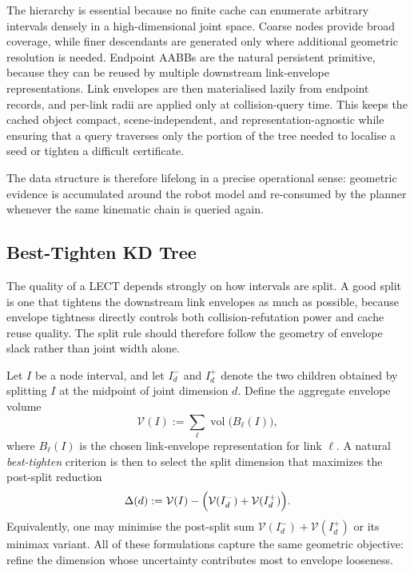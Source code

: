 \documentclass[journal]{IEEEtran}
\begin{document}
The hierarchy is essential because no finite cache can enumerate arbitrary
intervals densely in a high-dimensional joint space. Coarse nodes provide broad
coverage, while finer descendants are generated only where additional geometric
resolution is needed. Endpoint AABBs are the natural persistent primitive,
because they can be reused by multiple downstream link-envelope
representations. Link envelopes are then materialised lazily from endpoint
records, and per-link radii are applied only at collision-query time. This
keeps the cached object compact, scene-independent, and representation-agnostic
while ensuring that a query traverses only the portion of the tree needed to
localise a seed or tighten a difficult certificate.

The data structure is therefore lifelong in a precise operational sense:
geometric evidence is accumulated around the robot model and re-consumed by the
planner whenever the same kinematic chain is queried again.

\subsection{Best-Tighten KD Tree}
\label{sec:lect_split}

The quality of a LECT depends strongly on how intervals are split. A good split
is one that tightens the downstream link envelopes as much as possible, because
envelope tightness directly controls both collision-refutation power and cache
reuse quality. The split rule should therefore follow the geometry of envelope
slack rather than joint width alone.

Let $I$ be a node interval, and let $I_d^{-}$ and $I_d^{+}$ denote the two
children obtained by splitting $I$ at the midpoint of joint dimension $d$.
Define the aggregate envelope volume
\[
\mathcal{V}(I) := \sum_{\ell} \operatorname{vol}\bigl(B_\ell(I)\bigr),
\]
where $B_\ell(I)$ is the chosen link-envelope representation for link $\ell$.
A natural \emph{best-tighten} criterion is then to select the split dimension
that maximizes the post-split reduction
\[
\Delta(d) := \mathcal{V}(I)
- \Bigl(\mathcal{V}(I_d^{-}) + \mathcal{V}(I_d^{+})\Bigr).
\]
Equivalently, one may minimise the post-split sum
$\mathcal{V}(I_d^{-}) + \mathcal{V}(I_d^{+})$ or its minimax variant. All of
these formulations capture the same geometric objective: refine the dimension
whose uncertainty contributes most to envelope looseness.
\end{document}
